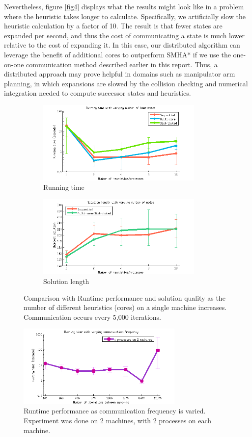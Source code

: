 \documentclass[11pt]{article}
\begin{document}
{Nevertheless, figure \ref{fig4} displays what the results might look like in a problem where the heuristic takes longer to calculate. Specifically, we artificially slow the heuristic calculation by a factor of 10. The result is that fewer states are expanded per second, and thus the cost of communicating a state is much lower relative to the cost of expanding it. In this case, our distributed algorithm can leverage the benefit of additional cores to outperform SMHA* if we use the one-on-one communication method described earlier in this report. Thus, a distributed approach may prove helpful in domains such as manipulator arm planning, in which expansions are slowed by the collision checking and numerical integration needed to compute successor states and heuristics.


\begin{figure}
\centering
\begin{subfigure}{3.2in}
  \includegraphics[width=3.2in]{graphs/figure1}
  \caption{Running time}
  \label{fig1}
\end{subfigure}
\begin{subfigure}{3.2in}
  \includegraphics[width=3.2in]{graphs/figure2}
  \caption{Solution length}
  \label{fig2}
\end{subfigure}
\caption{Comparison with Runtime performance and solution quality as the number of different heuristics (cores) on a single machine increases. Communication occurs every 5,000 iterations.}
\label{fig:singthread}
\end{figure}

\begin{figure}
\centering
\includegraphics[width=3.2in]{graphs/figure3}
\caption{Runtime performance as communication frequency is varied. Experiment was done on 2 machines, with 2 processes on each machine.}
\label{fig3}
\end{figure}

}
\end{document}
